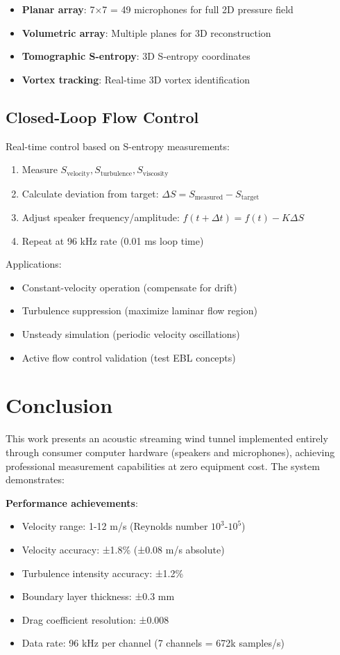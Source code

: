 \documentclass[12pt,a4paper]{article}
\begin{document}
\begin{itemize}
\item \textbf{Planar array}: 7×7 = 49 microphones for full 2D pressure field
\item \textbf{Volumetric array}: Multiple planes for 3D reconstruction
\item \textbf{Tomographic S-entropy}: 3D S-entropy coordinates
\item \textbf{Vortex tracking}: Real-time 3D vortex identification
\end{itemize}

\subsection{Closed-Loop Flow Control}

Real-time control based on S-entropy measurements:

\begin{enumerate}
\item Measure $S_{\text{velocity}}, S_{\text{turbulence}}, S_{\text{viscosity}}$
\item Calculate deviation from target: $\Delta S = S_{\text{measured}} - S_{\text{target}}$
\item Adjust speaker frequency/amplitude: $f(t+\Delta t) = f(t) - K \Delta S$
\item Repeat at 96 kHz rate (0.01 ms loop time)
\end{enumerate}

Applications:
\begin{itemize}
\item Constant-velocity operation (compensate for drift)
\item Turbulence suppression (maximize laminar flow region)
\item Unsteady simulation (periodic velocity oscillations)
\item Active flow control validation (test EBL concepts)
\end{itemize}

\section{Conclusion}

This work presents an acoustic streaming wind tunnel implemented entirely through consumer computer hardware (speakers and microphones), achieving professional measurement capabilities at zero equipment cost. The system demonstrates:

\textbf{Performance achievements}:
\begin{itemize}
\item Velocity range: 1-12 m/s (Reynolds number $10^3$-$10^5$)
\item Velocity accuracy: ±1.8\% (±0.08 m/s absolute)
\item Turbulence intensity accuracy: ±1.2\%
\item Boundary layer thickness: ±0.3 mm
\item Drag coefficient resolution: ±0.008
\item Data rate: 96 kHz per channel (7 channels = 672k samples/s)
\end{itemize}
\end{document}
